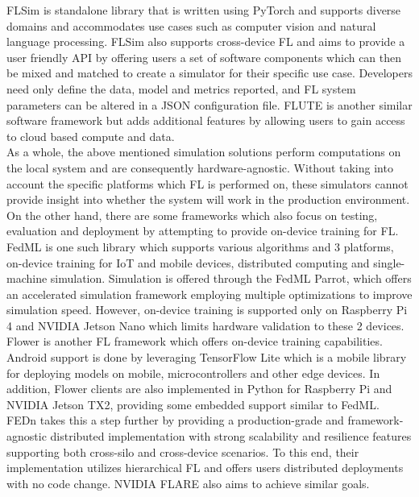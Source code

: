 \documentclass[12pt]{article}
\begin{document}
FLSim\cite{li_2021_flsim} is standalone library that is written using PyTorch\cite{} and supports diverse
domains and accommodates use cases such as computer vision and natural language processing. FLSim
also supports cross-device FL and aims to provide a user friendly API by offering users a set
of software components which can then be mixed and matched to create a simulator for their specific use case. Developers need only
define the data, model and metrics reported, and FL system parameters can be altered in a JSON\cite{json}
configuration file. FLUTE\cite{garcia_2022_flute} is another similar software framework but adds additional features by allowing users to gain access to cloud based
compute and data.\\

As a whole, the above mentioned simulation solutions perform computations on the local system and are consequently hardware-agnostic. Without
taking into account the specific platforms which FL is performed on, these simulators cannot provide
insight into whether the system will work in the production environment.\\

On the other hand, there are some frameworks which also focus on testing, evaluation and deployment by
attempting to provide on-device training for FL.
FedML\cite{he_2020_fedml} is one such library which supports various algorithms and 3 platforms, on-device training for IoT and
mobile devices, distributed computing and single-machine simulation.
Simulation is offered through the FedML Parrot\cite{tang_2023_fedml}, which offers an accelerated simulation
framework employing multiple optimizations to improve simulation speed.
However, on-device training is supported only on Raspberry Pi 4 and NVIDIA Jetson Nano which limits
hardware validation to these 2 devices.\\

Flower\cite{beutel2020flower} is another FL framework which offers on-device training capabilities. Android support
is done by leveraging TensorFlow Lite\cite{tflite} which is a mobile library for deploying models on mobile, microcontrollers and other edge devices.
In addition, Flower clients are also implemented in Python for Raspberry Pi and NVIDIA Jetson TX2,
providing some embedded support similar to FedML.\\

FEDn\cite{ekmefjord2021scalable} takes this a step further by providing a production-grade and framework-
agnostic distributed implementation with strong scalability and resilience features supporting both cross-silo and
cross-device scenarios. To this end, their implementation utilizes hierarchical FL\cite{} and
offers users distributed deployments with no code change. NVIDIA FLARE\cite{flare} also aims to achieve
similar goals.
\end{document}
